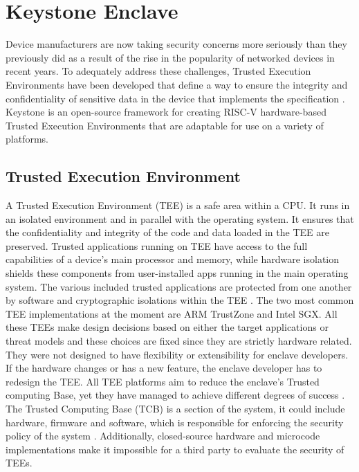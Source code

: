 \section{Keystone Enclave}
Device manufacturers are now taking security concerns more seriously than they previously did as a result of the rise in the popularity of networked devices in recent years.
To adequately address these challenges, Trusted Execution Environments have been developed that define a way to ensure the integrity and confidentiality of sensitive data in the device that implements the specification \cite{IntroTEE}. Keystone \cite{lee2020keystone} is an open-source framework for creating RISC-V hardware-based Trusted Execution Environments that are adaptable for use on a variety of platforms. 

\subsection{Trusted Execution Environment}
A Trusted Execution Environment (TEE) is a safe area within a CPU. It runs in an isolated environment and in parallel with the operating system.
It ensures that the confidentiality and integrity of the code and data loaded in the TEE are preserved. 
Trusted applications running on TEE have access to the full capabilities of a device's main processor and memory, while hardware isolation shields these components from user-installed apps running in the main operating system. The various included trusted applications are protected from one another by software and cryptographic isolations within the TEE \cite{IntroTEE}.
The two most common TEE implementations at the moment are ARM TrustZone and Intel SGX. All these TEEs make design decisions based on either the target applications or threat models and these choices are fixed since they are strictly hardware related. They were not designed to have flexibility or extensibility for enclave developers.  If the hardware changes or has a new feature, the enclave developer has to redesign the TEE.
All TEE platforms aim to reduce the enclave's Trusted computing Base, yet they have managed to achieve different degrees of success \cite{keysyone-blog-1}. The Trusted Computing Base (TCB) is a section of the system, it could include hardware, firmware and software, which is responsible for enforcing the security policy of the system \cite{tcb-def}. Additionally, closed-source hardware and microcode implementations make it impossible for a third party to evaluate the security of TEEs.

